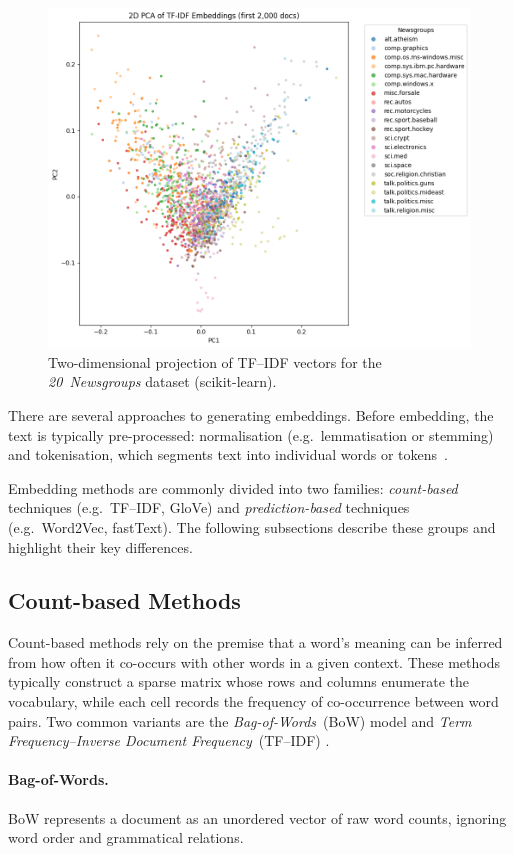 \documentclass{SGGW-thesis-EN}
\begin{document}
\begin{figure}[h!]
  \centering
  \includegraphics[height=9cm]{images/tfidf_embeddings.png}
  \caption{Two-dimensional projection of TF–IDF vectors for the \textit{20~Newsgroups} dataset (scikit-learn).}
  \label{fig:tfidf_embeddings}
\end{figure}

There are several approaches to generating embeddings.
Before embedding, the text is typically pre-processed: normalisation (e.g.\ lemmatisation or stemming)
and tokenisation, which segments text into individual words or tokens~\cite{jurafsky2023slp3}.

Embedding methods are commonly divided into two families:
\emph{count-based} techniques (e.g.\ TF–IDF, GloVe) and \emph{prediction-based} techniques (e.g.\ Word2Vec,
fastText).
The following subsections describe these groups and highlight their key differences.


\subsection{Count-based Methods}

Count-based methods rely on the premise that a word’s meaning can be inferred from how often it
co-occurs with other words in a given context.
These methods typically construct a sparse matrix whose rows and columns enumerate the
vocabulary, while each cell records the frequency of co-occurrence between word pairs.
Two common variants are the \textit{Bag-of-Words}~(BoW) model and \textit{Term Frequency–Inverse
Document Frequency}~(TF–IDF) \cite{jurafsky2023slp3}.
\paragraph{Bag-of-Words.}
BoW represents a document as an unordered vector of raw word counts, ignoring word order and
grammatical relations.
\end{document}
